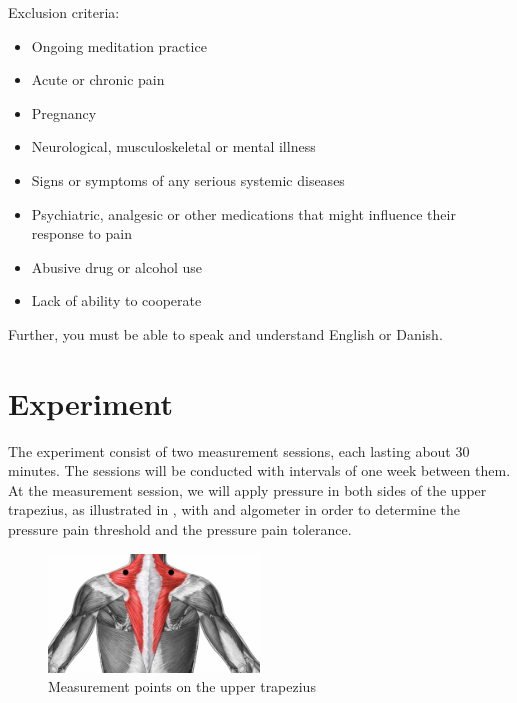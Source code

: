 Exclusion criteria:
\begin{itemize}
	\item Ongoing meditation practice 
	\vspace{-.3cm}
	\item Acute or chronic pain
	\vspace{-.3cm}
	\item Pregnancy 
	\vspace{-.3cm}
	\item Neurological, musculoskeletal or mental illness
	\vspace{-.3cm}
	\item Signs or symptoms of any serious systemic diseases 
	\vspace{-.3cm}
	\item Psychiatric, analgesic or other medications that might influence their response to pain 
		\vspace{-.3cm}
	\item Abusive drug or alcohol use
	\vspace{-.3cm}
	\item Lack of ability to cooperate
\end{itemize}

Further, you must be able to speak and understand English or Danish.
 
\section{Experiment}
The experiment consist of two measurement sessions, each lasting about 30 minutes. The sessions will be conducted with intervals of one week between them. At the measurement  session, we will apply pressure in both sides of the upper trapezius, as illustrated in , with and algometer in order to determine the pressure pain threshold and the pressure pain tolerance. 

\begin{figure}[H]
	\includegraphics[width=0.5\textwidth]{figures/trapezius.jpg}
	\caption{Measurement points on the upper trapezius}
	\label{fig:trapezius} 
\end{figure}

